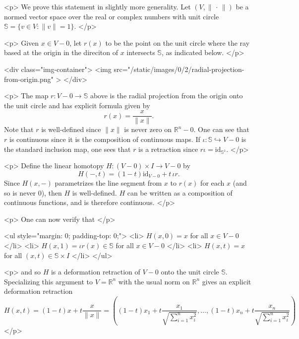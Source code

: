 <p>
    We prove this statement in slightly more generality. Let $(V,\lVert \, \cdot \, \rVert)$ be a normed vector space
    over the
    real or complex numbers with unit circle $\mathbb{S} = \{v \in V : \lVert v \rVert = 1\}$.
</p>

<p>
    Given $x \in V - 0$, let $r(x)$ to be the point on the unit circle
    where the ray based at the origin in the direciton of $x$ intersects $\mathbb{S}$,
    as indicated below.
</p>

<div class="img-container">
    <img src="/static/images/0/2/radial-projection-from-origin.png" >
</div>

<p>
    The map $r : V - 0 \to \mathbb{S}$ above is the radial projection from the origin
    onto the unit circle and has explicit formula given by
    $$r(x) = \frac{x}{\lVert x \rVert}.$$
    Note that $r$ is well-defined since $\lVert x \rVert$ is never zero on $\mathbb{R}^{n} - 0$.
    One can see that $r$ is continuous since it is the composition of continuous maps. If $\iota : \mathbb{S}
    \hookrightarrow V - 0$ is the standard inclusion map, one sees that $r$ is a retraction since $r\iota =
    \text{id}_{\mathbb{S}^1}$.
</p>

<p>
    Define the linear homotopy $H : (V - 0) \times I \to V - 0$ by
    $$H(-,t) = (1 - t)\text{id}_{V - 0} + t\,\iota r.$$
    Since $H(x,-)$ parametrizes the line segment from $x$ to $r(x)$ for each $x$ (and so is never $0$), then
    $H$ is well-defined. $H$ can be written as a composition of continuous functions, and is therefore
    continuous.
</p>

<p>
    One can now verify that
</p>

<ul style="margin: 0; padding-top: 0;">
    <li>
        $H(x,0) = x$ for all $x \in V - 0$
    </li>
    <li>
        $H(x,1) = \iota r(x) \in \mathbb{S}$ for all $x \in V - 0$
    </li>
    <li>
        $H(x,t) = x$ for all $(x,t) \in \mathbb{S} \times I$
    </li>
</ul>

<p>
    and so $H$ is a deformation retraction of $V - 0$ onto the unit circle $\mathbb{S}$. Specializing this argument to
    $V = \mathbb{R}^n$ with the usual norm on $\mathbb{R}^n$ gives an explicit deformation retraction
    $$H(x,t) = (1-t)x + t\frac{x}{\lVert x \rVert} = \left((1-t)x_1 + t\frac{x_1}{\sqrt{\sum_{i =
    1}^nx_i^2}},\dots,(1-t)x_n + t\frac{x_n}{\sqrt{\sum_{i = 1}^nx_i^2}}\right)$$
</p>